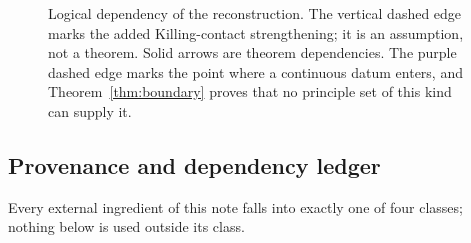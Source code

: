 \documentclass[
  aps,
  prd,
  preprint,
  nofootinbib,
  superscriptaddress,
  longbibliography
]{revtex4-2}
\begin{document}
\begin{figure}[!htbp]
\caption{Logical dependency of the reconstruction.  The vertical dashed
edge marks the added Killing-contact strengthening; it is an assumption,
not a theorem.  Solid arrows are theorem dependencies.  The purple dashed
edge marks the point where a continuous datum enters, and
Theorem~\ref{thm:boundary} proves that no principle set of this kind can
supply it.}
\label{fig:dependency}
\end{figure}

\subsection{Provenance and dependency ledger}
\label{sec:provenance}

Every external ingredient of this note falls into exactly one of four
classes; nothing below is used outside its class.
\end{document}
